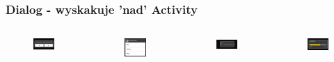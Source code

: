\documentclass{beamer}
\begin{document}
\begin{frame}\frametitle{Dialog - wyskakuje 'nad' Activity}
\begin{columns}
  \begin{figure}
   \centering
   \includegraphics[width=.7\textwidth]{images/dialog_buttons}
  \end{figure}
  \begin{figure}
   \centering
   \includegraphics[width=.7\textwidth]{images/dialog_list}
  \end{figure}
 \begin{figure}
   \centering
   \includegraphics[width=.7\textwidth]{images/dialog_progress_spinning}
  \end{figure}
  \begin{figure}
   \centering
   \includegraphics[width=.7\textwidth]{images/dialog_progress_bar}
  \end{figure}
\end{columns}
\end{frame}
\end{document}
